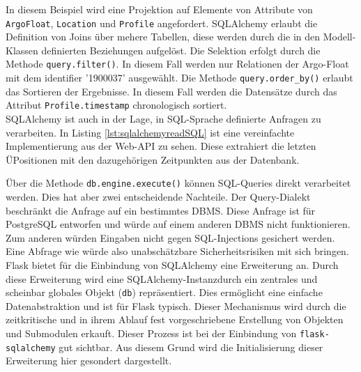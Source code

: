 In diesem Beispiel wird eine Projektion auf Elemente von Attribute von \texttt{ArgoFloat}, \texttt{Location} und \texttt{Profile} angefordert. SQLAlchemy erlaubt die Definition von Joins über mehere Tabellen, diese werden durch die in den Modell-Klassen definierten Beziehungen aufgelöst. Die Selektion erfolgt durch die Methode \texttt{query.filter()}. In diesem Fall werden nur Relationen der Argo-Float mit dem identifier '1900037' ausgewählt. Die Methode \texttt{query.order\_by()} erlaubt das Sortieren der Ergebnisse. In diesem Fall werden die Datensätze durch das Attribut \texttt{Profile.timestamp} chronologisch sortiert.
\\

SQLAlchemy ist auch in der Lage, in SQL-Sprache definierte Anfragen zu verarbeiten. In Listing \ref{lst:sqlalchemyreadSQL} ist eine vereinfachte Implementierung aus der Web-API zu sehen. Diese extrahiert die letzten ÜPositionen mit den dazugehörigen Zeitpunkten aus der Datenbank. 

    
Über die Methode \texttt{db.engine.execute()} können SQL-Queries direkt verarbeitet werden. Dies hat aber zwei entscheidende Nachteile. Der Query-Dialekt beschränkt die Anfrage auf ein bestimmtes DBMS. Diese Anfrage ist für PostgreSQL entworfen und würde auf einem anderen DBMS nicht funktionieren. Zum anderen würden Eingaben nicht gegen SQL-Injections gesichert werden. Eine Abfrage wie 
 würde also unabschätzbare Sicherheitsrisiken mit sich bringen.
\\




Flask bietet für die Einbindung von SQLAlchemy eine Erweiterung an. 
Durch diese Erweiterung wird eine SQLAlchemy-Instanzdurch ein zentrales und scheinbar globales Objekt (\texttt{db}) repräsentiert. Dies ermöglicht eine einfache Datenabstraktion und ist für Flask typisch. Dieser Mechanismus wird durch die zeitkritische und in ihrem Ablauf fest vorgeschriebene Erstellung von Objekten und Submodulen erkauft.
Dieser Prozess ist bei der Einbindung von \texttt{flask-sqlalchemy} gut sichtbar. Aus diesem Grund wird die Initialisierung dieser Erweiterung hier gesondert dargestellt.

